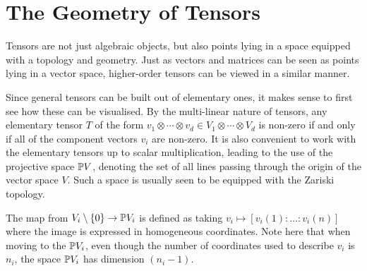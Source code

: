\documentclass[../Lael_John_MasterThesis_Draft.tex]{subfiles}
\begin{document}


\section{The Geometry of Tensors}\label{section:tensorgeometry}
Tensors are not just algebraic objects, but also points lying in a space equipped with a topology and geometry. Just as vectors and matrices can be seen as points lying in a vector space, higher-order tensors can be viewed in a similar manner. 

Since general tensors can be built out of elementary ones, it makes sense to first see how these can be visualised. By the multi-linear nature of tensors, any elementary tensor $T$ of the form $v_1 \otimes \cdots \otimes v_d \in V_1 \otimes \cdots \otimes V_d$ is non-zero if and only if all of the component vectors $v_i$ are non-zero. It is also convenient to work with the elementary tensors up to scalar multiplication, leading to the use of the projective space $\mathbb{P} V$, denoting the set of all lines passing through the origin of the vector space $V$. Such a space is usually seen to be equipped with the Zariski topology.

The map from $V_i \setminus \{0\} \to \mathbb{P} V_i$ is defined as taking $v_i \mapsto [v_i(1): \ldots :v_i(n)]$ where the image is expressed in homogeneous coordinates. Note here that when moving to the $\mathbb{P} V_i$, even though the number of coordinates used to describe $v_i$ is $n_i$, the space $\mathbb{P} V_i$ has dimension $(n_i - 1)$.
\end{document}
